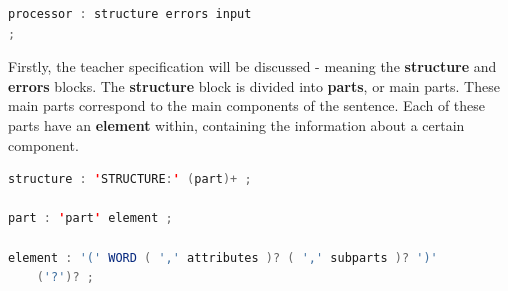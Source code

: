 \begin{center}
\begin{minipage}{8cm}
\begin{lstlisting}[language=java, basicstyle=\small, label={lst:processor_prod}, caption=Processor production]
processor : structure errors input
;
\end{lstlisting}
\end{minipage}
\end{center}


Firstly, the teacher specification will be discussed - meaning the \textbf{structure} and \textbf{errors} blocks.
The \textbf{structure} block is divided into \textbf{parts}, or main parts. These main parts correspond to the main components of the sentence. Each of these parts have an \textbf{element} within, containing the information about a certain component.

\begin{center}
\begin{minipage}{14cm}
\begin{lstlisting}[language=java, basicstyle=\small, label={lst:dsl_struct_prod}, caption=DSL structure/part/element productions]
structure : 'STRUCTURE:' (part)+ ;

part : 'part' element ;

element : '(' WORD ( ',' attributes )? ( ',' subparts )? ')' 
    ('?')? ;
\end{lstlisting}
\end{minipage}
\end{center}

%
%

